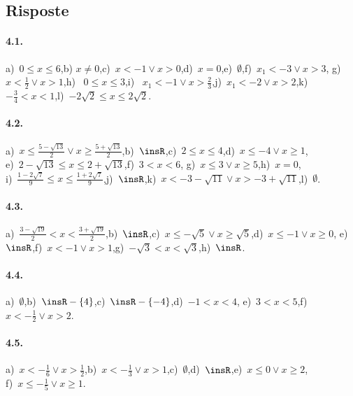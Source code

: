 \subsection{Risposte}
\paragraph{4.1.} a)~$0\le x\le 6$,\quad b) $x\neq 0$,\quad c)~$x<-1\vee x>0$,\quad d)~$x=0$,\quad e)~$\emptyset $,\quad f)~$x_1<-3\vee x>3$,\quad
g)~$x<\frac 1 2\vee x>1$,\quad h)~ $0\le x\le 3$,\quad i)~ $x_1<-1\vee x>\frac 2 3$,\quad j)~$x_1<-2\vee x>2$,\quad k)~$-\frac 3 4<x<1$,\quad l)~$-2\sqrt 2\le x\le 2\sqrt 2$.

\paragraph{4.2.} a)~$x\le \frac{5-\sqrt{13}} 2\vee x\ge \frac{5+\sqrt{13}} 2$,\quad b)~$\insR$,\quad c)~$2\le x\le 4$,\quad d)~$x\le -4\vee x\ge 1$,\protect \\ e)~$2-\sqrt{13}\le x\le 2+\sqrt{13}$,\quad f)~$3<x<6$,\quad
g)~$x\le 3\vee x\ge 5$,\quad h)~$x=0$,\protect\\
i)~$\frac{1-2\sqrt 7} 9\le x\le \frac{1+2\sqrt 7} 9$,\quad j)~$\insR$,\quad k)~$x<-3-\sqrt{11}\vee x>-3+\sqrt{11}$,\quad l)~$\emptyset $.

\paragraph{4.3.} a)~$\frac{3-\sqrt{19}} 2<x<\frac{3+\sqrt{19}} 2$,\quad b)~$\insR$,\quad c)~$x\le -\sqrt 5\vee x\ge \sqrt 5$,\quad d)~$x\le -1\vee x\ge 0$,\quad
e)~$\insR$,\quad f)~$x<-1\vee x>1$,\quad g)~$-\sqrt 3<x<\sqrt 3$,\quad h)~$\insR$.

\paragraph{4.4.} a)~$\emptyset$,\quad b)~$\insR-\{4\}$,\quad c)~$\insR-\{-4\}$,\quad d)~$-1<x<4$,\quad
e)~$3<x<5$,\quad f)~$x<-\frac{1}{2}\vee x>2$.

\paragraph{4.5.} a)~$x<-\frac{1}{6}\vee x>\frac{1}{2}$,\quad b)~$x<-\frac{1}{3}\vee x>1$,\quad c)~$\emptyset$,\quad d)~$\insR$,\quad e)~$x\le 0\vee x\ge 2$,\protect\\
f)~$x\le-\frac{1}{5}\vee x\ge 1$.


